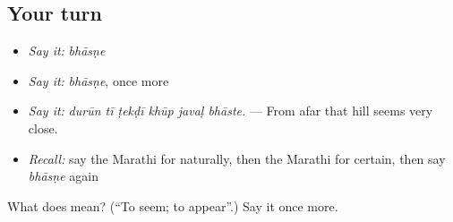 \subsection*{Your turn}
\begin{itemize}
\raggedright
  \item \emph{Say it:} \emph{bhāsṇe}
  \item \emph{Say it:} \emph{bhāsṇe}, once more
  \item \emph{Say it:} \emph{durūn tī ṭekḍī khūp javaḷ bhāste.} — From afar that hill seems very close.
  \item \emph{Recall:} say the Marathi for naturally, then the Marathi for certain, then say \emph{bhāsṇe} again
\end{itemize}

\begin{tcolorbox}[breakable,colback=teal!4,colframe=teal!35!black,title={Before you move on}]
What does  mean? (\textquotedblleft{}To seem; to appear\textquotedblright{}.) Say it once more.
\end{tcolorbox}
